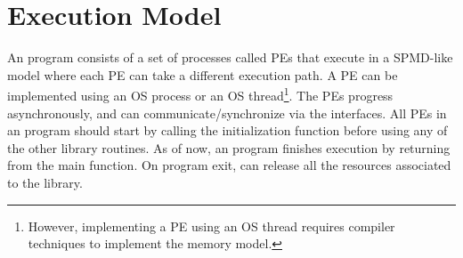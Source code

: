 \section{Execution Model}
\label{subsec:execution_model}

An \openshmem{} program consists of a set of \openshmem{} processes called \ac{PE}s that execute in a \ac{SPMD}-like model where each \ac{PE} can take a different execution path. A \ac{PE} can be implemented using an OS process or an OS thread\footnote{However, implementing a \ac{PE} using an OS thread requires compiler techniques to implement the \openshmem{} memory model.}.
The \ac{PE}s progress asynchronously, and can communicate/synchronize 
via the \openshmem{} interfaces. All \ac{PE}s in an \openshmem{} program should start by calling the initialization function  before using any of the other \openshmem{} library routines. As of now, an \openshmem program finishes execution by returning from the main function. 
On program exit, \openshmem can release all the resources associated to the library. 

